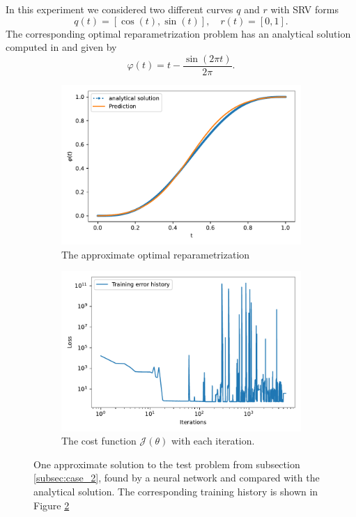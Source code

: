 In this experiment we considered two different curves \(q\) and \(r\) with SRV forms
\begin{equation*}
    q(t) = [\cos(t), \sin(t)], \quad  r(t) = [0,1]. 
\end{equation*}
The corresponding optimal reparametrization problem has an analytical solution computed in \cite[A.1]{woien2019} and given by 
\begin{equation*}
    \varphi(t) = t - \frac{\sin(2 \pi t)}{2 \pi}.
\end{equation*}

\begin{figure}[b]
    \begin{subfigure}[t]{0.5\textwidth}
        \centering
        \includegraphics[width=\linewidth]{figures/curve_2/exp_6/plot_0_0.pdf}
        \caption{The approximate optimal reparametrization}\label{fig:curve_2_solution}
    \end{subfigure}
    \begin{subfigure}[t]{0.5\textwidth}
        \centering
        \includegraphics[width=\linewidth]{figures/curve_2/exp_6/history_plot_0.pdf}
        \caption{The cost function \(\mathcal{J}(\theta)\) with each iteration.}\label{fig:curve_2_history}
    \end{subfigure}
    \caption{One approximate solution to the test problem from subsection \ref{subsec:case_2}, found by a neural network and compared with the analytical solution. The corresponding training history is shown in Figure \ref{fig:curve_2_history} }\label{fig:curve_2_example}
\end{figure}

